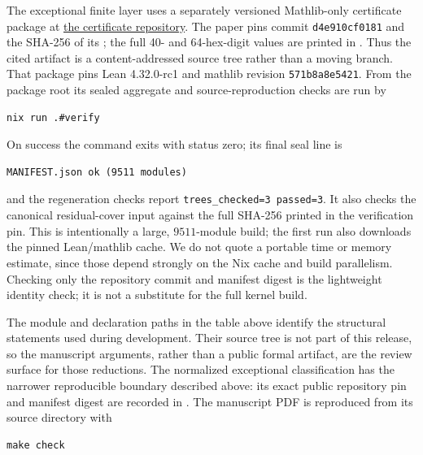 The exceptional finite layer uses a separately versioned Mathlib-only
certificate package at
\href{https://github.com/tavisrudd/finitegeom-q25-certificates}%
{the certificate repository}.  The paper pins commit
\texttt{d4e910cf0181} and the SHA-256 of its ; the full
40- and 64-hex-digit values are printed in
.  Thus the cited artifact is a
content-addressed source tree rather than a moving branch.
That package pins Lean 4.32.0-rc1 and mathlib revision
\texttt{571b8a8e5421}.  From the package root
its sealed aggregate and source-reproduction checks are run by
\begin{verbatim}
nix run .#verify
\end{verbatim}
On success the command exits with status zero; its final seal line is
\begin{verbatim}
MANIFEST.json ok (9511 modules)
\end{verbatim}
and the regeneration checks report \texttt{trees\_checked=3 passed=3}.
It also checks the canonical residual-cover input against the full SHA-256
printed in the verification pin.
This is intentionally a large, $9511$-module build; the first run also
downloads the pinned Lean/mathlib cache.  We do not quote a portable time or
memory estimate, since those depend strongly on the Nix cache and build
parallelism.  Checking only the repository commit and manifest digest is the
lightweight identity check; it is not a substitute for the full kernel build.

The module and declaration paths in the table above identify the structural
statements used during development.  Their source tree is not part of this
release, so the manuscript arguments, rather than a public formal artifact,
are the review surface for those reductions.  The normalized exceptional
classification has the narrower reproducible boundary described above: its
exact public repository pin and manifest digest are recorded in
.
The manuscript PDF is reproduced from its source directory with
\begin{verbatim}
make check
\end{verbatim}

\clearpage
